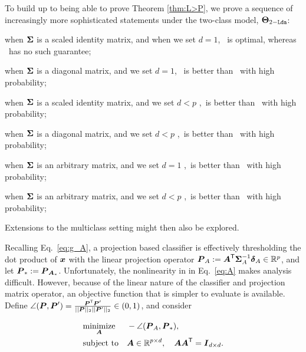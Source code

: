 \documentclass[10pt]{article}
\begin{document}
To build up to being able to prove Theorem \ref{thm:L>P}, we prove a sequence of increasingly more sophisticated statements under the two-class model, $\boldsymbol{\Theta}_{2-{\sc \texttt{Lda}}}$:
\begin{compactenum}
\item when $\boldsymbol{\Sigma}$ is a scaled identity matrix, and when we set $d=1$, \Lol~is optimal, whereas \Pca~has no such guarantee;
\item when $\boldsymbol{\Sigma}$ is a diagonal matrix, and we set $d=1$, \Lol~is better than \Pca~with high probability;

\item when $\boldsymbol{\Sigma}$ is a scaled identity matrix, and we set $d<p$ ,\Lol~is better than \Pca~with high probability;
\item when $\boldsymbol{\Sigma}$ is a diagonal matrix, and we set $d<p$ ,\Lol~is better than \Pca~with high probability;

\item when $\boldsymbol{\Sigma}$ is an arbitrary  matrix, and we set $d=1$ ,\Lol~is better than \Pca~with high probability;
\item when $\boldsymbol{\Sigma}$ is an arbitrary matrix, and we set $d<p$ ,\Lol~is better than \Pca~with high probability;

\end{compactenum}

Extensions to the multiclass setting might then also be explored.



Recalling Eq.~\eqref{eq:g_A}, a projection based classifier is effectively thresholding the dot product of $\boldsymbol{x}$ with the linear projection operator $\boldsymbol{P}_A :=\boldsymbol{A}^{\mathsf{T}} \boldsymbol{\Sigma}_A^{-1} \boldsymbol{\delta}_A \in \mathbb{R}^p$, and let $\boldsymbol{P}_*:=\boldsymbol{P}_{\boldsymbol{A}_*}$.  Unfortunately, the nonlinearity in in Eq.~\eqref{eq:A} makes analysis difficult.
However, because of the linear nature of the classifier and projection matrix operator, an objective function that is simpler to evaluate is available.
Define 
$\angle(\boldsymbol{P},\boldsymbol{P}') = \frac{ \boldsymbol{P}^{\mathsf{T}} \boldsymbol{P}'}{||\boldsymbol{P}||_2 ||\boldsymbol{P}'||_2} \in (0,1)$, and consider

\begin{equation} \label{eq:angle}
\begin{aligned}
& \underset{\boldsymbol{A}}{\text{minimize}}
& & -\angle(\boldsymbol{P}_A,\boldsymbol{P}_*), 
\\ & \text{subject to} & & \boldsymbol{A} \in \mathbb{R}^{p \times d}, \quad \boldsymbol{A} \boldsymbol{A}^{\mathsf{T}} = \boldsymbol{I}_{d \times d}.
\end{aligned}
\end{equation}
\end{document}
